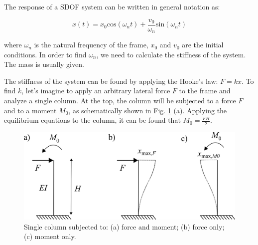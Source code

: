 \documentclass[12pt,letter]{article}
\numberwithin{ex}{section} %
\numberwithin{re}{section} %
\begin{document}
%



\pagebreak
The response of a SDOF system can be written in general notation as:

\begin{equation}
x(t) = x_0\text{cos}(\omega_n t) + \frac{v_0}{\omega_n}\text{sin}(\omega_n t)
\end{equation}

where $\omega_n$ is the natural frequency of the frame, $x_0$ and $v_0$ are the initial conditions. In order to find $\omega_n$, we need to calculate the stiffness of the system. The mass is usually given. 

The stiffness of the system can be found by applying the Hooke's law: $F = k x$. To find $k$, let's imagine to apply an arbitrary lateral force $F$ to the frame and analyze a single column. At the top, the column will be subjected to a force $F$ and to a moment $M_0$, as schematically shown in Fig. \ref{fig:columns_draw} (a). Applying the equilibrium equations to the column, it can be found that $M_0 = \frac{F H}{2}$. 

\begin{figure}[H]
	\centering
	\includegraphics{../figures/frame_columns.png}
	\caption{Single column subjected to: (a) force and moment; (b) force only; (c) moment only.}
	\label{fig:columns_draw}
\end{figure}
\end{document}
